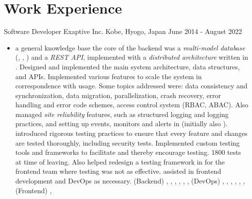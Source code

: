 \section{Work Experience}
\cventry
  {Software Developer} %
  {Exaptive Inc.} %
  {Kobe, Hyogo, Japan} %
  {June 2014 - August 2022} %
  {
    \begin{itemize} %
      \liststyle
      \item { a general knowledge base
          the core of the backend was a {\it multi-model database} (\rfmongodb, \rfneofj, \rfelastic) and a {\it REST API}, implemented with a {\it distributed architecture} written in \rfnodejs. 
          Designed and implemented the main system architecture, data structures, and APIs. 
          Implemented various features to scale the system in correspondence with usage. 
          Some topics addressed were:
          data consistency and synchronization,
          data migration,
          parallelization,
          crash recovery,
          error handling and error code schemes,
          access control system (RBAC, ABAC).
          Also managed {\it site reliability} features, such as structured logging and logging practices, and setting up events, monitors and alerts in \rfnewrelic (initially also \rfsumologic).
         introduced rigorous testing practices to ensure that every feature and changes are tested thoroughly, including security tests. 
        Implemented custom testing tools and frameworks to facilitate and thereby encourage testing.
        1800 tests at time of leaving. 
        Also helped redesign a testing framework in \rfcypress for the frontend team where testing was not as effective.  
         assisted in frontend development and DevOps as necessary. 
        \tgskills (Backend) \rfnodejs, \rfmongodb, \rfneofj, \rfredis,  \rfbash, \rfdocker, 
        (DevOps) \rfaws, \rfterraform, \rfansible, \rfjenkins, \rfnewrelic, \rfsumologic,
        (Frontend) \rfreact, \rfcypress
      }
\end{itemize}}
